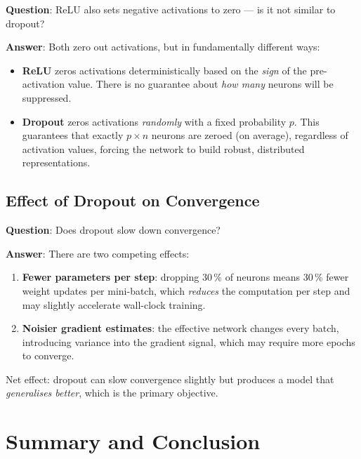 \documentclass[12pt,a4paper]{article}
\begin{document}
\textbf{Question}: ReLU also sets negative activations to zero --- is it
not similar to dropout?

\textbf{Answer}: Both zero out activations, but in fundamentally different
ways:

\begin{itemize}
  \item \textbf{ReLU} zeros activations deterministically based on the
        \emph{sign} of the pre-activation value.  There is no guarantee
        about \emph{how many} neurons will be suppressed.
  \item \textbf{Dropout} zeros activations \emph{randomly} with a fixed
        probability $p$.  This guarantees that exactly $p \times n$ neurons
        are zeroed (on average), regardless of activation values, forcing the
        network to build robust, distributed representations.
\end{itemize}

\subsection{Effect of Dropout on Convergence}
\label{sec:qa:convergence}

\textbf{Question}: Does dropout slow down convergence?

\textbf{Answer}: There are two competing effects:

\begin{enumerate}
  \item \textbf{Fewer parameters per step}: dropping 30\,\% of neurons means
        30\,\% fewer weight updates per mini-batch, which \emph{reduces} the
        computation per step and may slightly accelerate wall-clock training.
  \item \textbf{Noisier gradient estimates}: the effective network changes
        every batch, introducing variance into the gradient signal, which
        may require more epochs to converge.
\end{enumerate}

Net effect: dropout can slow convergence slightly but produces a model that
\emph{generalises better}, which is the primary objective.

\section{Summary and Conclusion}
\label{sec:summary}
\end{document}
